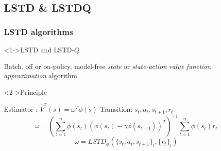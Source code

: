 \documentclass{beamer}
\begin{document}
\subsection{LSTD \& LSTDQ}
\label{sec-3_1}
\begin{frame}
\frametitle{LSTD algorithms}
\label{sec-3_1_1}
\begin{block}<1->{LSTD and LSTD-$Q$}
\label{sec-3_1_1_1}

     Batch, off or on-policy, model-free \emph{state} or \emph{state-action} \emph{value function approximation} algorithm
\end{block}
\begin{block}<2->{Principle}
\label{sec-3_1_1_2}

     Estimator : $\hat V^\pi(s) = \omega^T\phi(s)$ \hfill Transition: $s_t,a_t,s_{t+1},r_t$
     \begin{equation*}
     \omega = \left(\sum_{t=1}^n
     \phi(s_t)(\phi(s_t)-\gamma\phi(s_{t+1}))^T\right)^{-1}
     \sum_{t=1}^n \phi(s_t) r_t
     \end{equation*}
     \begin{equation*}
     \omega = LSTD_\phi( \{s_t,a_t,s_{t+1}\}_t,\{{ r_t}\}_t)
     \end{equation*}
\end{block}
\end{frame}
\end{document}
